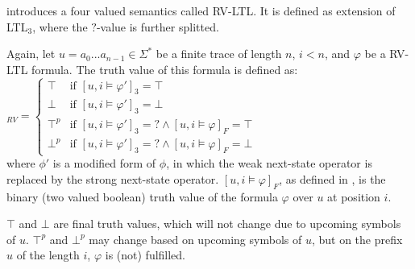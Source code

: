 		\cite{10.1007/978-3-540-77395-5_11} introduces a four valued semantics called RV-LTL. It is defined as extension of LTL$_3$, where the $?$-value is further splitted.
		\begin{definition}[RV-LTL]
			Again, let $u=a_0...a_{n-1}\in\Sigma^*$ be a finite trace of length $n$, $i < n$, and $\varphi$ be a RV-LTL formula. The truth value of this formula is defined as:\\
			\begin{math}
				[u,i\models\varphi]_{RV}=
					\begin{cases}
						\top & \text{if } [u, i\vDash \varphi']_3=\top\\
						\bot & \text{if } [u, i\vDash \varphi']_3=\bot\\
						\top^p & \text{if } [u, i\vDash \varphi']_3= ? \land [u,i\vDash\varphi]_F=\top\\
						\bot^p & \text{if } [u, i\vDash \varphi']_3= ? \land [u,i\vDash\varphi]_F=\bot
					\end{cases}
			\end{math}\\
			where $\phi'$ is a modified form of $\phi$, in which the weak next-state operator is replaced by the strong next-state operator. $[u,i\vDash\varphi]_F$, as defined in \cite{10.1007/3-540-15648-8_16}, is the binary (two valued boolean) truth value of the formula $\varphi$ over $u$ at position $i$.
		\end{definition}
		$\top$ and $\bot$ are final truth values, which will not change due to upcoming symbols of $u$. $\top^p$ and $\bot^p$ may change based on upcoming symbols of $u$, but on the prefix $u$ of the length $i$, $\varphi$ is (not) fulfilled. 
	
	

